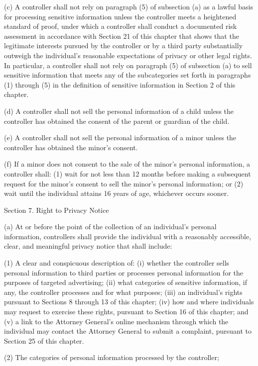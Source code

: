 (c) A controller shall not rely on paragraph (5) of subsection (a) as a lawful basis for processing sensitive information unless the controller meets a heightened standard of proof, under which a controller shall conduct a documented risk assessment in accordance with Section 21 of this chapter that shows that the legitimate interests pursued by the controller or by a third party substantially outweigh the individual’s reasonable expectations of privacy or other legal rights. In particular, a controller shall not rely on paragraph (5) of subsection (a) to sell sensitive information that meets any of the subcategories set forth in paragraphs (1) through (5) in the definition of sensitive information in Section 2 of this chapter.  

(d) A controller shall not sell the personal information of a child unless the controller has obtained the consent of the parent or guardian of the child.

(e) A controller shall not sell the personal information of a minor unless the controller has obtained the minor’s consent.

(f) If a minor does not consent to the sale of the minor’s personal information, a controller shall: (1) wait for not less than 12 months before making a subsequent request for the minor’s consent to sell the minor’s personal information; or (2) wait until the individual attains 16 years of age, whichever occurs sooner.

Section 7. Right to Privacy Notice

(a) At or before the point of the collection of an individual’s personal information, controllers shall provide the individual with a reasonably accessible, clear, and meaningful privacy notice that shall include:

(1) A clear and conspicuous description of: (i) whether the controller sells personal information to third parties or processes personal information for the purposes of targeted advertising; (ii) what categories of sensitive information, if any, the controller processes and for what purposes; (iii) an individual’s rights pursuant to Sections 8 through 13 of this chapter; (iv) how and where individuals may request to exercise these rights, pursuant to Section 16 of this chapter; and (v) a link to the Attorney General’s online mechanism through which the individual may contact the Attorney General to submit a complaint, pursuant to Section 25 of this chapter.

(2) The categories of personal information processed by the controller;

